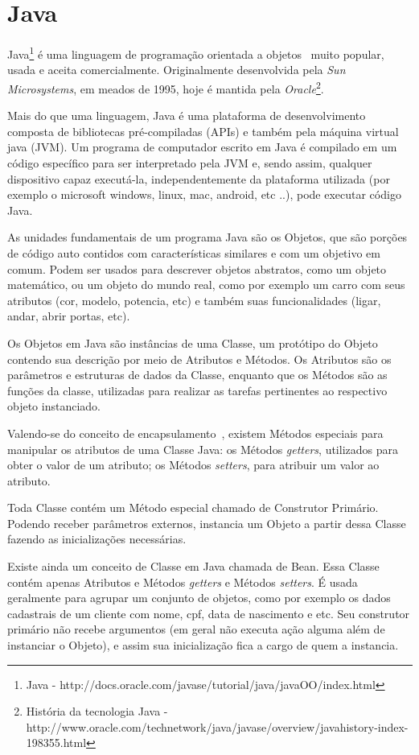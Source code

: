 \section{Java}
\label{sec:java}

Java\footnote{Java - http://docs.oracle.com/javase/tutorial/java/javaOO/index.html} é uma linguagem de programação orientada a objetos~\cite{plai_obj} muito popular, usada e aceita comercialmente. Originalmente desenvolvida pela \emph{Sun Microsystems}, em meados de 1995, hoje é mantida pela \emph{Oracle}\footnote{História da tecnologia Java - http://www.oracle.com/technetwork/java/javase/overview/javahistory-index-198355.html}. 
\par
Mais do que uma linguagem, Java é uma plataforma de desenvolvimento composta de bibliotecas pré-compiladas (APIs) e também pela máquina virtual java (JVM). Um programa de computador escrito em Java é compilado em um código específico para ser interpretado pela JVM e, sendo assim, qualquer dispositivo capaz executá-la, independentemente da plataforma utilizada (por exemplo o microsoft windows, linux, mac, android, etc ..), pode executar código Java.
\par
As unidades fundamentais de um programa Java são os Objetos, que são porções de código auto contidos com características similares e com um objetivo em comum. Podem ser usados para descrever objetos abstratos, como um objeto matemático, ou um objeto do mundo real, como por exemplo um carro com seus atributos (cor, modelo, potencia, etc) e também suas funcionalidades (ligar, andar, abrir portas, etc).
\par
Os Objetos em Java são instâncias de uma Classe, um protótipo do Objeto contendo sua descrição por meio de Atributos e Métodos. Os Atributos são os parâmetros e estruturas de dados da Classe, enquanto que os Métodos são as funções da classe, utilizadas para realizar as tarefas pertinentes ao respectivo objeto instanciado.
\par
Valendo-se do conceito de encapsulamento~\cite{plai_obj}, existem Métodos especiais para manipular os atributos de uma Classe Java: os Métodos \emph{getters}, utilizados para obter o valor de um atributo; os Métodos \emph{setters}, para atribuir um valor ao atributo.
\par
Toda Classe contém um Método especial chamado de Construtor Primário. Podendo receber parâmetros externos, instancia um Objeto a partir dessa Classe fazendo as inicializações necessárias. 
\par
Existe ainda um conceito de Classe em Java chamada de Bean. Essa Classe contém apenas Atributos e Métodos \emph{getters} e Métodos \emph{setters}. É usada geralmente para agrupar um conjunto de objetos, como por exemplo os dados cadastrais de um cliente com nome, cpf, data de nascimento e etc. Seu construtor primário não recebe argumentos (em geral não executa ação alguma além de instanciar o Objeto), e assim sua inicialização fica a cargo de quem a instancia.
